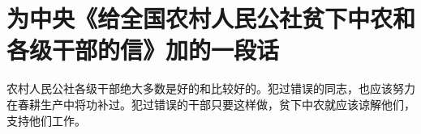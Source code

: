 \section[为中央《给全国农村人民公社贫下中农和各级干部的信》加的一段话（一九六七年二月二十日）]{为中央《给全国农村人民公社贫下中农和各级干部的信》加的一段话}


农村人民公社各级干部绝大多数是好的和比较好的。犯过错误的同志，也应该努力在春耕生产中将功补过。犯过错误的干部只要这样做，贫下中农就应该谅解他们，支持他们工作。


